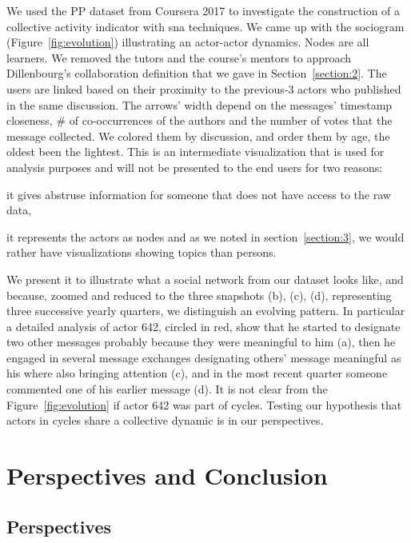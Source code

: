 \documentclass[a4paper,twoside]{article}
\begin{document}
We used the PP dataset from Coursera 2017 to investigate the construction of a collective activity indicator with \gls{sna} techniques.  We came up with the sociogram (Figure~\ref{fig:evolution}) illustrating an actor-actor dynamics.  Nodes are all learners.  We removed the tutors and the course's mentors to approach Dillenbourg's collaboration definition that we gave in Section~\ref{section:2}.  The users are linked based on their proximity to the previous-3 actors who published in the same discussion.  The arrows' width depend on the messages' timestamp closeness, \# of co-occurrences of the authors and the number of votes that the message collected.  We colored them by discussion, and order them by age, the oldest been the lightest.  This is an intermediate visualization that is used for analysis purposes and will not be presented to the end users for two reasons:
\begin{inparaenum}
\item it gives abstruse information for someone that does not have access to the raw data,
\item it represents the actors as nodes and as we noted in section~\ref{section:3}, we would rather have visualizations showing topics than persons.
\end{inparaenum}
We present it to illustrate what a social network from our dataset looks like, and because, zoomed and reduced to the three snapshots (b), (c), (d), representing three successive yearly quarters, we distinguish an evolving pattern.  In particular a detailed analysis of actor 642, circled in red, show that he started to designate two other messages probably because they were meaningful to him (a), then he engaged in several message exchanges designating others' message meaningful as his where also bringing attention (c), and in the most recent quarter someone commented one of his earlier message (d).  It is not clear from the Figure~\ref{fig:evolution} if actor 642 was part of cycles.  Testing our hypothesis that actors in cycles share a collective dynamic is in our perspectives.

\section{Perspectives and Conclusion}
\label{section:6}


\subsection{Perspectives}
\end{document}
